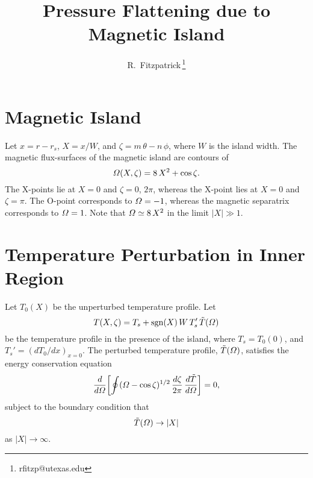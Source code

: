 \documentclass[12pt,prb,aps,notitlepage]{revtex4-1}
\begin{document}
\title{Pressure Flattening due to Magnetic Island}
\author{R.~Fitzpatrick\,\footnote{rfitzp@utexas.edu}}
\begin{abstract}
\end{abstract}
\maketitle

\section{Magnetic Island}
Let $x=r-r_s$, $X=x/W$, and $\zeta= m\,\theta-n\,\phi$, where $W$ is the island width. The magnetic flux-surfaces of the magnetic island are contours of
\begin{equation}
{\mit\Omega}(X,\zeta) = 8\,X^2 + \cos\zeta.
\end{equation}
The X-points lie at $X=0$ and $\zeta = 0$, $2\pi$, whereas the X-point lies at
$X=0$ and $\zeta=\pi$. The O-point corresponds to ${\mit\Omega}=-1$, whereas the magnetic separatrix corresponds to ${\mit\Omega}=1$.  Note that ${\mit\Omega}\simeq
8\,X^2$ in the limit $|X|\gg 1$. 

\section{Temperature Perturbation in Inner Region}
Let $T_0(X)$ be the unperturbed temperature profile. Let 
\begin{equation}\label{e2}
T(X,\zeta) = T_s + {\rm sgn}(X)\,W\,T_s'\,\tilde{T}({\mit\Omega})
\end{equation}
 be the temperature profile in the presence of the island,
where $T_s=T_0(0)$, and  $T_s'=(dT_0/dx)_{x=0}$. 
The perturbed temperature profile, $\tilde{T}({\mit\Omega})$,  satisfies the energy conservation equation
\begin{equation}\label{e3}
\frac{d}{d{\mit\Omega}}\!\left[\oint({\mit\Omega}-\cos\zeta)^{1/2}\,\frac{d\zeta}{2\pi}\,\frac{d\tilde{T}}{d
{\mit\Omega}} \right]= 0,
\end{equation}
subject to the boundary condition that
\begin{equation}\label{e4}
\tilde{T}({\mit\Omega}) \rightarrow |X|
\end{equation}
as $|X|\rightarrow\infty$. 
\end{document}
